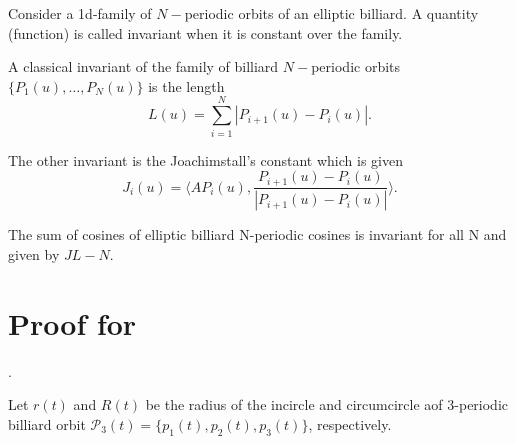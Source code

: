 

\begin{definition}
\label{def:invariant}
Consider a 1d-family of $N-$periodic orbits of an elliptic billiard.  A quantity (function) is called invariant when it is constant over the family. 
\end{definition}

A classical invariant of the family of  billiard $N-$periodic orbits $\{P_1(u),\ldots, P_N(u)\}$ is the length 
\[ L(u)=\sum_{i=1}^N |P_{i+1}(u)-P_i(u)|.\]

The other invariant  is the Joachimstall's constant which is given
\[J_i(u)= \big\langle A P_i(u),\frac{P_{i+1}(u)-P_{i }(u)}{ |P_{i+1}(u)-P_{i }(u)|}\big\rangle.\]

\begin{theorem}\label{thm:soma_cossenos_N}
The sum of cosines of elliptic billiard N-periodic cosines is invariant for all N and given by $J L - N$.
\end{theorem}

\section{Proof for }

\cite{reznik2020-intelligencer,garcia2020-new-properties}.

Let $r(t)$ and $R(t)$ be the radius of the incircle and circumcircle aof 3-periodic billiard orbit $\mathcal{P}_3(t)=\{p_1(t),p_2(t),p_3(t)\}$, respectively.

